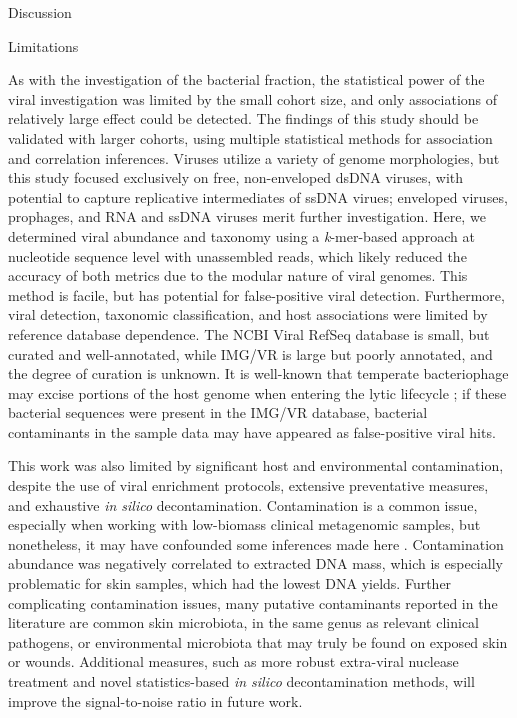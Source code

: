 \documentclass[oneside,12pt,final]{sty/ucthesis-CA2012}
\begin{document}
\begin{mainmatter}
\begin{section}{Discussion}
\begin{subsection}{Limitations}

As with the investigation of the bacterial fraction, the statistical power of the viral investigation was limited by the small cohort size, and only associations of relatively large effect could be detected. The findings of this study should be validated with larger cohorts, using multiple statistical methods for association and correlation inferences. Viruses utilize a variety of genome morphologies, but this study focused exclusively on free, non-enveloped dsDNA viruses, with potential to capture replicative intermediates of ssDNA virues; enveloped viruses, prophages, and RNA and ssDNA viruses merit further investigation. Here, we determined viral abundance and taxonomy using a \textit{k}-mer-based approach at nucleotide sequence level with unassembled reads, which likely reduced the accuracy of both metrics due to the modular nature of viral genomes. This method is facile, but has potential for false-positive viral detection. Furthermore, viral detection, taxonomic classification, and host associations were limited by reference database dependence. The NCBI Viral RefSeq database is small, but curated and well-annotated, while IMG/VR is large but poorly annotated, and the degree of curation is unknown. It is well-known that temperate bacteriophage may excise portions of the host genome when entering the lytic lifecycle \cite{RN151, RN161}; if these bacterial sequences were present in the IMG/VR database, bacterial contaminants in the sample data may have appeared as false-positive viral hits. 

This work was also limited by significant host and environmental contamination, despite the use of viral enrichment protocols, extensive preventative measures, and exhaustive \textit{in silico} decontamination. Contamination is a common issue, especially when working with low-biomass clinical metagenomic samples, but nonetheless, it may have confounded some inferences made here \cite{RN71, RN70}. Contamination abundance was negatively correlated to extracted DNA mass, which is especially problematic for skin samples, which had the lowest DNA yields. Further complicating contamination issues, many putative contaminants reported in the literature are common skin microbiota, in the same genus as relevant clinical pathogens, or environmental microbiota that may truly be found on exposed skin or wounds. Additional measures, such as more robust extra-viral nuclease treatment and novel statistics-based \textit{in silico} decontamination methods, will improve the signal-to-noise ratio in future work.


\end{subsection}
\end{section}
\end{mainmatter}
\end{document}
